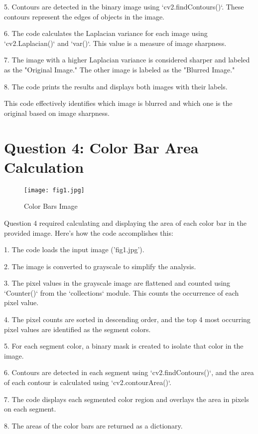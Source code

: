 \documentclass{article}
\begin{document}
5. Contours are detected in the binary image using `cv2.findContours()`. These contours represent the edges of objects in the image.

6. The code calculates the Laplacian variance for each image using `cv2.Laplacian()` and `var()`. This value is a measure of image sharpness.

7. The image with a higher Laplacian variance is considered sharper and labeled as the "Original Image." The other image is labeled as the "Blurred Image."

8. The code prints the results and displays both images with their labels.

This code effectively identifies which image is blurred and which one is the original based on image sharpness.

\section{Question 4: Color Bar Area Calculation}

\begin{figure}[ht]
    \centering
    \texttt{[image: fig1.jpg]}
    \caption{Color Bars Image}
\end{figure}

Question 4 required calculating and displaying the area of each color bar in the provided image. Here's how the code accomplishes this:

1. The code loads the input image ('fig1.jpg').

2. The image is converted to grayscale to simplify the analysis.

3. The pixel values in the grayscale image are flattened and counted using `Counter()` from the `collections` module. This counts the occurrence of each pixel value.

4. The pixel counts are sorted in descending order, and the top 4 most occurring pixel values are identified as the segment colors.

5. For each segment color, a binary mask is created to isolate that color in the image.

6. Contours are detected in each segment using `cv2.findContours()`, and the area of each contour is calculated using `cv2.contourArea()`.

7. The code displays each segmented color region and overlays the area in pixels on each segment.

8. The areas of the color bars are returned as a dictionary.
\end{document}
